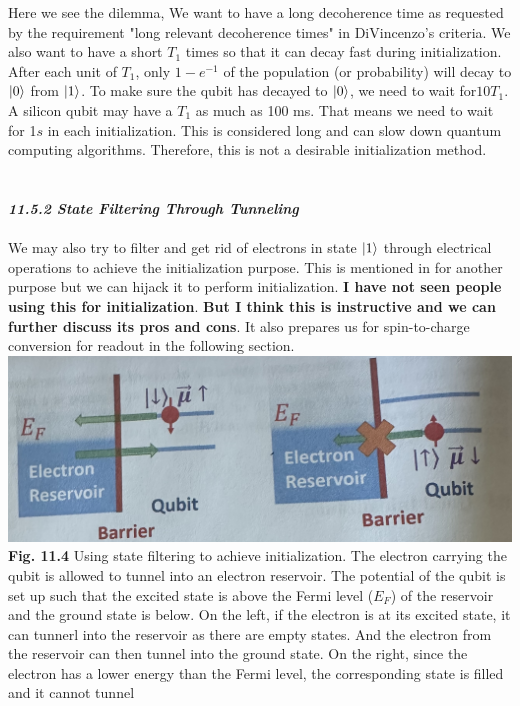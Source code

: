 \documentclass{article}
\newcommand{\bfit}[1]{\textit{\textbf{#1}}}
\begin{document}
Here we see the dilemma, We want to have a long decoherence time as requested by the requirement
"long relevant decoherence times" in DiVincenzo's criteria. We also want to have a short $T_1$ times
so that it can decay fast during initialization. After each unit of $T_1$, only $1-e^{-1}$ of the population
(or probability) will decay to $\ket{0}$ from $\ket{1}$. To make sure the qubit has decayed to $\ket{0}$,
we need to wait for$10T_1$. A silicon qubit may have a $T_1$ as much as 100 ms. That means we need to wait for
1$s$ in each initialization. This is considered long and can slow down quantum computing algorithms. Therefore,
this is not a desirable initialization method.\\\\\\
\bfit{\large 11.5.2 State Filtering Through Tunneling}\\\\
We may also try to filter and get rid of electrons in state $\ket{1}$ through electrical
operations to achieve the initialization purpose. This is mentioned in \cite{8elzerman2004single} for another purpose
but we can hijack it to perform initialization. \textbf{I have not seen people using this for initialization}. \textbf{But I think this is instructive and we can further discuss its pros and cons}.
It also prepares us for spin-to-charge conversion for readout in the following section.\\

\includegraphics[scale=0.45]{Fig.11.4.jpeg}\\
\textbf{Fig. 11.4} Using state filtering to achieve initialization. The electron carrying the qubit is allowed
to tunnel into an electron reservoir. The potential of the qubit is set up such that the excited state is above
the Fermi level ($E_F$) of the reservoir and the ground state is below. On the left,
if the electron is at its excited state, it can tunnerl into the reservoir as there are empty states.
And the electron from the reservoir can then tunnel into the ground state. On the right, since the electron has
a lower energy than the Fermi level, the corresponding state is filled and it cannot tunnel\\
\end{document}
